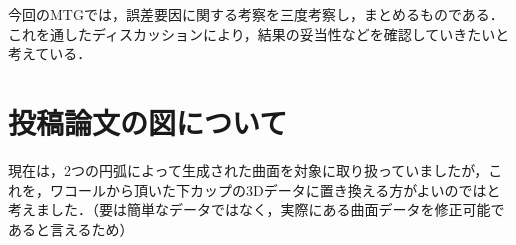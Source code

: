 \documentclass[16.7pt]{jsarticle}
\begin{document}
		
	\articleSPRobj
		今回のMTGでは，誤差要因に関する考察を三度考察し，まとめるものである．これを通したディスカッションにより，結果の妥当性などを確認していきたいと考えている．
		

	\articleSPRitemsone
		
		\tableofcontents
		
		
	\articleSPRitemstwo
	\renewcommand{\labelitemi}{$\blacktriangledown$}
	\newcommand{\argmax}{\mathop{\rm arg~max}\limits}
	\newcommand{\argmin}{\mathop{\rm arg~min}\limits}
	\newcommand{\Ker}{{\rm Ker}}
	\newcommand{\rank}{{\rm rank}}
\section{投稿論文の図について}
	現在は，2つの円弧によって生成された曲面を対象に取り扱っていましたが，これを，ワコールから頂いた下カップの3Dデータに置き換える方がよいのではと考えました．（要は簡単なデータではなく，実際にある曲面データを修正可能であると言えるため）
	
\end{document}
